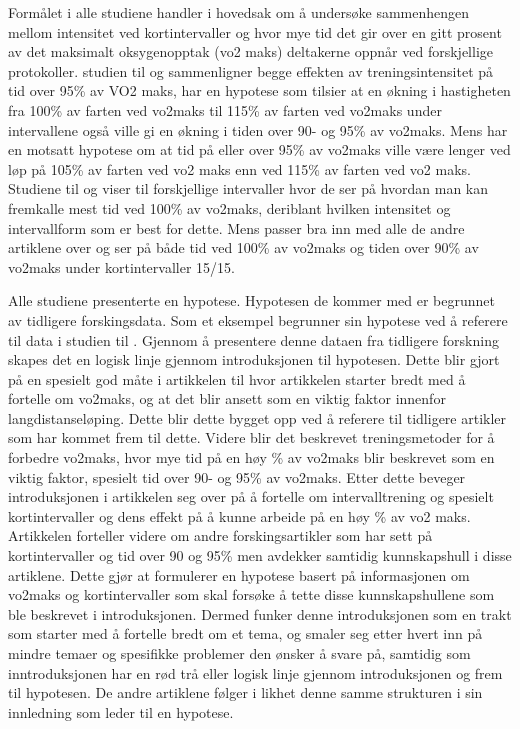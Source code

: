 \documentclass[
]{book}
\begin{document}
Formålet i alle studiene handler i hovedsak om å undersøke sammenhengen mellom intensitet ved kortintervaller og hvor mye tid det gir over en gitt prosent av det maksimalt oksygenopptak (vo2 maks) deltakerne oppnår ved forskjellige protokoller. studien til \citet{thevenet2007} og \citet{wakefield2009} sammenligner begge effekten av treningsintensitet på tid over 95\% av VO2 maks, \citet{thevenet2007} har en hypotese som tilsier at en økning i hastigheten fra 100\% av farten ved vo2maks til 115\% av farten ved vo2maks under intervallene også ville gi en økning i tiden over 90- og 95\% av vo2maks. Mens \citet{wakefield2009} har en motsatt hypotese om at tid på eller over 95\% av vo2maks ville være lenger ved løp på 105\% av farten ved vo2 maks enn ved 115\% av farten ved vo2 maks. Studiene til \citet{billat2000} og \citet{billat2001} viser til forskjellige intervaller hvor de ser på hvordan man kan fremkalle mest tid ved 100\% av vo2maks, deriblant hvilken intensitet og intervallform som er best for dette. Mens \citet{dupont2002} passer bra inn med alle de andre artiklene over og ser på både tid ved 100\% av vo2maks og tiden over 90\% av vo2maks under kortintervaller 15/15.

Alle studiene presenterte en hypotese. Hypotesen de kommer med er begrunnet av tidligere forskingsdata. Som et eksempel begrunner \citet{wakefield2009} sin hypotese ved å referere til data i studien til \citet{thevenet2007}. Gjennom å presentere denne dataen fra tidligere forskning skapes det en logisk linje gjennom introduksjonen til hypotesen. Dette blir gjort på en spesielt god måte i artikkelen til \citet{thevenet2007} hvor artikkelen starter bredt med å fortelle om vo2maks, og at det blir ansett som en viktig faktor innenfor langdistanseløping. Dette blir dette bygget opp ved å referere til tidligere artikler som har kommet frem til dette. Videre blir det beskrevet treningsmetoder for å forbedre vo2maks, hvor mye tid på en høy \% av vo2maks blir beskrevet som en viktig faktor, spesielt tid over 90- og 95\% av vo2maks. Etter dette beveger introduksjonen i artikkelen seg over på å fortelle om intervalltrening og spesielt kortintervaller og dens effekt på å kunne arbeide på en høy \% av vo2 maks. Artikkelen forteller videre om andre forskingsartikler som har sett på kortintervaller og tid over 90 og 95\% men avdekker samtidig kunnskapshull i disse artiklene. Dette gjør at \citet{thevenet2007} formulerer en hypotese basert på informasjonen om vo2maks og kortintervaller som skal forsøke å tette disse kunnskapshullene som ble beskrevet i introduksjonen.
Dermed funker denne introduksjonen som en trakt som starter med å fortelle bredt om et tema, og smaler seg etter hvert inn på mindre temaer og spesifikke problemer den ønsker å svare på, samtidig som inntroduksjonen har en rød trå eller logisk linje gjennom introduksjonen og frem til hypotesen. De andre artiklene følger i likhet denne samme strukturen i sin innledning som leder til en hypotese.
\end{document}
